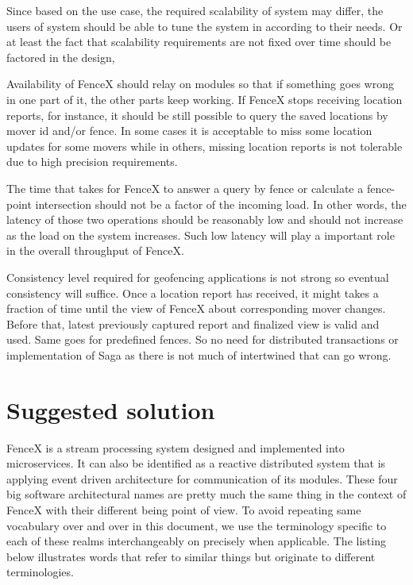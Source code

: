 \documentclass[a4]{report}
\begin{document}
    Since based on the use case, the required scalability of system may differ, the users of system should be able to
    tune the system in according to their needs.
    Or at least the fact that scalability requirements are not fixed over time should be factored in the design,

    Availability of FenceX should relay on modules so that if something goes wrong in one part of it, the other parts
    keep working.
    If FenceX stops receiving location reports, for instance, it should be still possible to query the saved
    locations by mover id and/or fence.
    In some cases it is acceptable to miss some location updates for some movers while in others, missing location
    reports is not tolerable due to high precision requirements.

    The time that takes for FenceX to answer a query by fence or calculate a fence-point intersection should not be a
    factor of the incoming load.
    In other words, the latency of those two operations should be reasonably low and should not increase as the load
    on the system increases.
    Such low latency will play a important role in the overall throughput of FenceX.

    Consistency level required for geofencing applications is not strong so eventual consistency will suffice.
    Once a location report has received, it might takes a fraction of time until the view of FenceX about
    corresponding mover changes.
    Before that, latest previously captured report and finalized view is valid and used.
    Same goes for predefined fences.
    So no need for distributed transactions or implementation of Saga as there is not much of intertwined that can go
    wrong.

    \chapter{Suggested solution}
    FenceX is a stream processing system designed and implemented into microservices.
    It can also be identified as a reactive distributed system that is applying event driven architecture for
    communication of its modules.
    These four big software architectural names are pretty much the same thing in the context of FenceX with their
    different being point of view.
    To avoid repeating same vocabulary over and over in this document, we use the terminology specific to each of
    these realms interchangeably on precisely when applicable.
    The listing below illustrates words that refer to similar things but originate to different terminologies.
\end{document}

